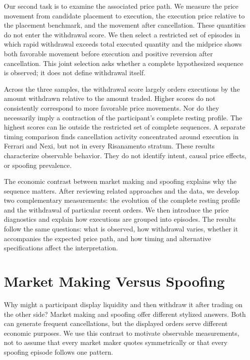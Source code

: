 \documentclass[11pt]{article}
\begin{document}
Our second task is to examine the associated price path. We measure the price movement from candidate placement to execution, the execution price relative to the placement benchmark, and the movement after cancellation. These quantities do not enter the withdrawal score. We then select a restricted set of episodes in which rapid withdrawal exceeds total executed quantity and the midprice shows both favorable movement before execution and positive reversion after cancellation. This joint selection asks whether a complete hypothesized sequence is observed; it does not define withdrawal itself.

Across the three samples, the withdrawal score largely orders executions by the amount withdrawn relative to the amount traded. Higher scores do not consistently correspond to more favorable price movements. Nor do they necessarily imply a contraction of the participant's complete resting profile. The highest scores can lie outside the restricted set of complete sequences. A separate timing comparison finds cancellation activity concentrated around execution in Ferrari and Nexi, but not in every Risanamento stratum. These results characterize observable behavior. They do not identify intent, causal price effects, or spoofing prevalence.

The economic contrast between market making and spoofing explains why the sequence matters. After reviewing related approaches and the data, we develop two complementary measurements: the evolution of the complete resting profile and the withdrawal of particular recent orders. We then introduce the price diagnostics and explain how executions are grouped into episodes. The results follow the same questions: what is observed, how withdrawal varies, whether it accompanies the expected price path, and how timing and alternative specifications affect the interpretation.

\section{Market Making Versus Spoofing}
\label{sec:mm_vs_spoofing}
Why might a participant display liquidity and then withdraw it after trading on the other side? Market making and spoofing offer different stylized answers. Both can generate frequent cancellations, but the displayed orders serve different economic purposes. We use this contrast to motivate observable measurements, not to assume that every market maker quotes symmetrically or that every spoofing episode follows one pattern.
\end{document}

